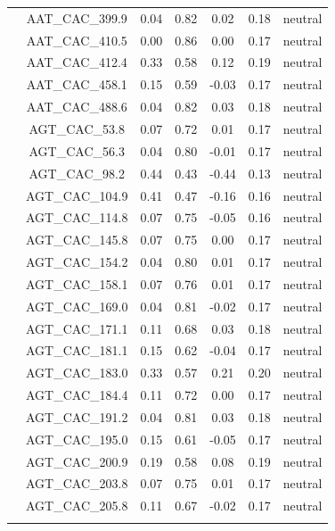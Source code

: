 \documentclass[11pt,]{article}
\begin{document}
\begin{longtable}[c]{@{}lcccccc@{}}
\\\addlinespace
& AAT\_CAC\_399.9 & 0.04 & 0.82 & 0.02 & 0.18 & neutral
\\\addlinespace
& AAT\_CAC\_410.5 & 0.00 & 0.86 & 0.00 & 0.17 & neutral
\\\addlinespace
& AAT\_CAC\_412.4 & 0.33 & 0.58 & 0.12 & 0.19 & neutral
\\\addlinespace
& AAT\_CAC\_458.1 & 0.15 & 0.59 & -0.03 & 0.17 & neutral
\\\addlinespace
& AAT\_CAC\_488.6 & 0.04 & 0.82 & 0.03 & 0.18 & neutral
\\\addlinespace
& AGT\_CAC\_53.8 & 0.07 & 0.72 & 0.01 & 0.17 & neutral
\\\addlinespace
& AGT\_CAC\_56.3 & 0.04 & 0.80 & -0.01 & 0.17 & neutral
\\\addlinespace
& AGT\_CAC\_98.2 & 0.44 & 0.43 & -0.44 & 0.13 & neutral
\\\addlinespace
& AGT\_CAC\_104.9 & 0.41 & 0.47 & -0.16 & 0.16 & neutral
\\\addlinespace
& AGT\_CAC\_114.8 & 0.07 & 0.75 & -0.05 & 0.16 & neutral
\\\addlinespace
& AGT\_CAC\_145.8 & 0.07 & 0.75 & 0.00 & 0.17 & neutral
\\\addlinespace
& AGT\_CAC\_154.2 & 0.04 & 0.80 & 0.01 & 0.17 & neutral
\\\addlinespace
& AGT\_CAC\_158.1 & 0.07 & 0.76 & 0.01 & 0.17 & neutral
\\\addlinespace
& AGT\_CAC\_169.0 & 0.04 & 0.81 & -0.02 & 0.17 & neutral
\\\addlinespace
& AGT\_CAC\_171.1 & 0.11 & 0.68 & 0.03 & 0.18 & neutral
\\\addlinespace
& AGT\_CAC\_181.1 & 0.15 & 0.62 & -0.04 & 0.17 & neutral
\\\addlinespace
& AGT\_CAC\_183.0 & 0.33 & 0.57 & 0.21 & 0.20 & neutral
\\\addlinespace
& AGT\_CAC\_184.4 & 0.11 & 0.72 & 0.00 & 0.17 & neutral
\\\addlinespace
& AGT\_CAC\_191.2 & 0.04 & 0.81 & 0.03 & 0.18 & neutral
\\\addlinespace
& AGT\_CAC\_195.0 & 0.15 & 0.61 & -0.05 & 0.17 & neutral
\\\addlinespace
& AGT\_CAC\_200.9 & 0.19 & 0.58 & 0.08 & 0.19 & neutral
\\\addlinespace
& AGT\_CAC\_203.8 & 0.07 & 0.75 & 0.01 & 0.17 & neutral
\\\addlinespace
& AGT\_CAC\_205.8 & 0.11 & 0.67 & -0.02 & 0.17 & neutral
\\\addlinespace

\end{longtable}
\end{document}
